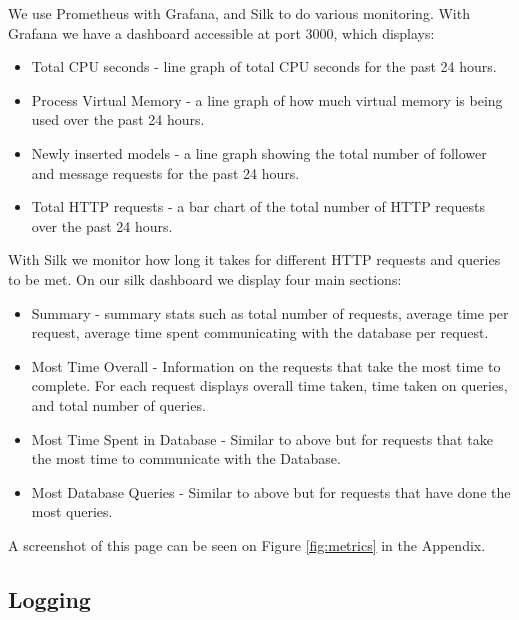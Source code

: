 We use Prometheus with Grafana, and Silk to do various monitoring. With Grafana we have a dashboard accessible at port 3000, which displays:
\begin{itemize}
    \item Total CPU seconds - line graph of total CPU seconds for the past 24 hours.
    
    \item Process Virtual Memory - a line graph of how much virtual memory is being used over the past 24 hours.
    
    \item Newly inserted models - a line graph showing the total number of follower and message requests for the past 24 hours.
    
    \item Total HTTP requests - a bar chart of the total number of HTTP requests over the past 24 hours.
\end{itemize}

With Silk we monitor how long it takes for different HTTP requests and queries to be met. On our silk dashboard we display four main sections:

\begin{itemize}
    \item Summary - summary stats such as total number of requests, average time per request, average time spent communicating with the database per request.
    
    \item Most Time Overall - Information on the requests that take the most time to complete. For each request displays overall time taken, time taken on queries, and total number of queries.

    \item Most Time Spent in Database - Similar to above but for requests that take the most time to communicate with the Database.

    \item Most Database Queries - Similar to above but for requests that have done the most queries.
\end{itemize}

A screenshot of this page can be seen on Figure \ref{fig:metrics} in the Appendix.

\subsection*{Logging}

